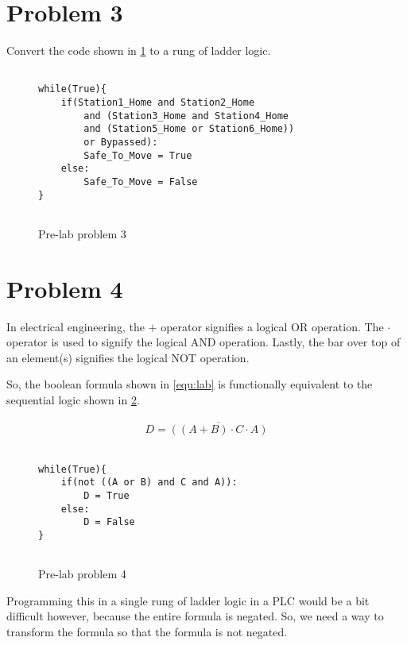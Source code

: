 \section{Problem 3}

Convert the code shown in \figureautorefname \ref{fig:Problem3} to a rung of ladder logic.

\lstset{style=mystyle}
\lstset{language=python}
\begin{figure}[h]
\begin{lstlisting}[firstnumber=1]

while(True){
    if(Station1_Home and Station2_Home
        and (Station3_Home and Station4_Home
        and (Station5_Home or Station6_Home))
        or Bypassed):
        Safe_To_Move = True
    else:
        Safe_To_Move = False
}
    
\end{lstlisting}
\caption{Pre-lab problem 3}
\label{fig:Problem3}
\end{figure}

\section{Problem 4}

In electrical engineering, the $+$ operator signifies a logical OR operation. The $\cdot$ operator is used to signify the logical AND operation. Lastly, the bar over top of an element(s) signifies the logical NOT operation.

So, the boolean formula shown in \equationautorefname \ref{equ:lab} is functionally equivalent to the sequential logic shown in \figureautorefname \ref{fig:Problem4}.

\begin{align}
    \label{equ:lab}
    D = \overline{((A+B)\cdot C\cdot A)}
\end{align}


\lstset{style=mystyle}
\lstset{language=python}
\begin{figure}[h]
\begin{lstlisting}[firstnumber=1]

while(True){
    if(not ((A or B) and C and A)):
        D = True
    else:
        D = False
}
    
\end{lstlisting}
\caption{Pre-lab problem 4}
\label{fig:Problem4}
\end{figure}

Programming this in a single rung of ladder logic in a PLC would be a bit difficult however, because the entire formula is negated. So, we need a way to transform the formula so that the formula is not negated.  

